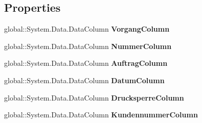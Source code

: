 \subsection*{Properties}
\begin{DoxyCompactItemize}
\item 
global\+::\+System.\+Data.\+Data\+Column {\bfseries Vorgang\+Column}\hypertarget{class_products_1_1_data_1_1ds_sage_1_1_order_data_table_a09da2984fab3243bbe2bc0c83280517e}{}\label{class_products_1_1_data_1_1ds_sage_1_1_order_data_table_a09da2984fab3243bbe2bc0c83280517e}

\item 
global\+::\+System.\+Data.\+Data\+Column {\bfseries Nummer\+Column}\hypertarget{class_products_1_1_data_1_1ds_sage_1_1_order_data_table_a9573cb256165d55a10280521f1d88aea}{}\label{class_products_1_1_data_1_1ds_sage_1_1_order_data_table_a9573cb256165d55a10280521f1d88aea}

\item 
global\+::\+System.\+Data.\+Data\+Column {\bfseries Auftrag\+Column}\hypertarget{class_products_1_1_data_1_1ds_sage_1_1_order_data_table_a99151c651506f131f65a021845618b51}{}\label{class_products_1_1_data_1_1ds_sage_1_1_order_data_table_a99151c651506f131f65a021845618b51}

\item 
global\+::\+System.\+Data.\+Data\+Column {\bfseries Datum\+Column}\hypertarget{class_products_1_1_data_1_1ds_sage_1_1_order_data_table_a2a449492178cffbed132965aef2ae176}{}\label{class_products_1_1_data_1_1ds_sage_1_1_order_data_table_a2a449492178cffbed132965aef2ae176}

\item 
global\+::\+System.\+Data.\+Data\+Column {\bfseries Drucksperre\+Column}\hypertarget{class_products_1_1_data_1_1ds_sage_1_1_order_data_table_a8824d5faeb0684d09a7de85d0b186eab}{}\label{class_products_1_1_data_1_1ds_sage_1_1_order_data_table_a8824d5faeb0684d09a7de85d0b186eab}

\item 
global\+::\+System.\+Data.\+Data\+Column {\bfseries Kundennummer\+Column}\hypertarget{class_products_1_1_data_1_1ds_sage_1_1_order_data_table_a1ad0c9413db8c0f7a2b44ea8865e0b26}{}\label{class_products_1_1_data_1_1ds_sage_1_1_order_data_table_a1ad0c9413db8c0f7a2b44ea8865e0b26}


\end{DoxyCompactItemize}
